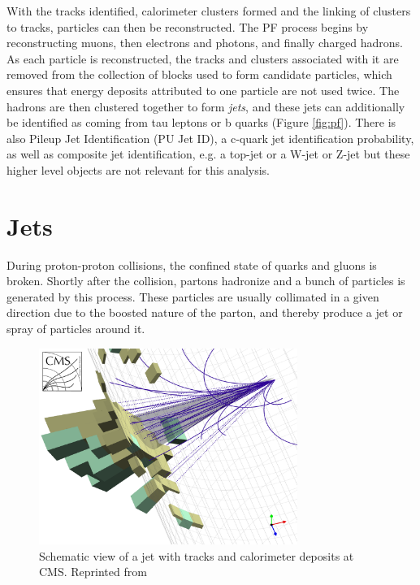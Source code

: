 With the tracks identified, calorimeter clusters formed and the linking of clusters to tracks, particles can then be reconstructed. The PF process begins by reconstructing muons, then electrons and photons, and finally charged hadrons. As each particle is reconstructed, the tracks and clusters associated with it are removed from the collection of blocks used to form candidate particles, which ensures that energy deposits attributed to one particle are not used twice. The hadrons are then clustered together to form \textit{jets}, and these jets can additionally be identified as coming from tau leptons or b quarks (Figure \ref{fig:pf}). There is also Pileup Jet Identification (PU Jet ID), a c-quark jet identification probability, as well as composite jet identification, e.g. a top-jet or a W-jet or Z-jet but these higher level objects are not relevant for this analysis.

\section{Jets}

During proton-proton collisions, the confined state of quarks and gluons is broken. Shortly after the collision, partons hadronize and a bunch of particles is generated by this process. These particles are usually collimated in a given direction due to the boosted nature of the parton, and thereby produce a jet or spray of particles around it.

\begin{figure}[h]
 	\centering
 	\includegraphics[width=0.75\textwidth]{figures/cmsjet.png}
 	\singlespace
 	\caption{Schematic view of a jet with tracks and calorimeter deposits at CMS. Reprinted from \cite{jetCMS}}
  	\label{fig:jets2} 	
 \end{figure}

